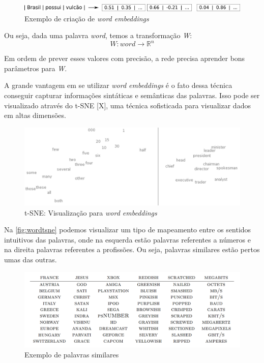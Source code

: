 \begin{figure}[htb]
  \caption{Exemplo de criação de \textit{word embeddings}} \label{fig:criacaowordemb}
  \begin{center}
      \includegraphics[scale=0.3]{img/criacaowordemb}
  \end{center}
\end{figure}


Ou seja, dada uma palavra \textit{word}, temos a transformação \textit{W}:
\begin{equation}
W:word \to \mathbb{R}^n
\end{equation}

Em ordem de prever esses valores com precisão, a rede precisa aprender bons parâmetros para \textit{W}.

A grande vantagem em se utilizar \textit{word embeddings} é o fato dessa técnica conseguir capturar informações sintáticas e semânticas das palavras. Isso pode ser visualizado através do t-SNE [X], uma técnica sofisticada para visualizar dados em altas dimensões.

\begin{figure}[htb]
  \caption{t-SNE: Visualização para \textit{word embeddings}}\label{fig:wordtsne}
  \begin{center}
      \includegraphics[scale=0.25]{img/Turian-WordTSNE}
  \end{center}
\end{figure}

Na \autoref{fig:wordtsne} podemos visualizar um tipo de mapeamento entre os sentidos intuitivos das palavras, onde na esquerda estão palavras referentes a números e na direita palavras referentes a profissões. Ou seja, palavras similares estão pertos umas das outras.

\begin{figure}[htb]
  \caption{Exemplo de palavras similares}\label{fig:palavrassimilares}
  \begin{center}
      \includegraphics[scale=0.25]{img/Colbert-WordTable2}
  \end{center}
\end{figure}

